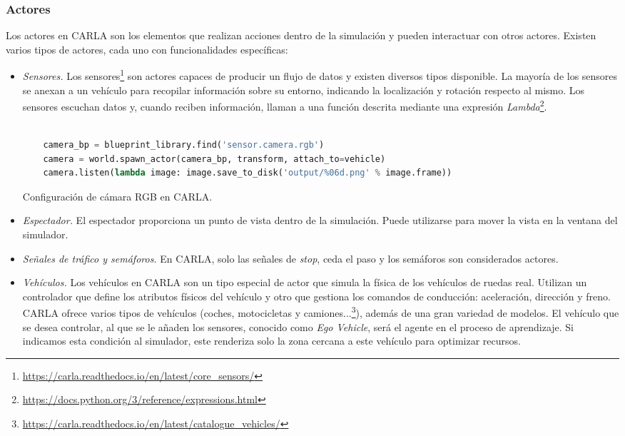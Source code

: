 \subsubsection{Actores}

Los actores en CARLA son los elementos que realizan acciones dentro de la simulación y pueden interactuar con otros actores. Existen varios tipos de actores, cada uno con funcionalidades específicas:

\begin{itemize}
\item \textit{Sensores.} Los sensores\footnote{\url{https://carla.readthedocs.io/en/latest/core_sensors/}} son actores capaces de producir un flujo de datos y existen diversos tipos disponible. La mayoría de los sensores se anexan a un vehículo para recopilar información sobre su entorno, indicando la localización y rotación respecto al mismo. Los sensores escuchan datos y, cuando reciben información, llaman a una función descrita mediante una expresión \textit{Lambda}\footnote{\url{https://docs.python.org/3/reference/expressions.html}}. 

	\begin{code}[h]
	\begin{lstlisting}[language=python]
	
	camera_bp = blueprint_library.find('sensor.camera.rgb')
	camera = world.spawn_actor(camera_bp, transform, attach_to=vehicle)
	camera.listen(lambda image: image.save_to_disk('output/%06d.png' % image.frame))

	\end{lstlisting}
	\caption[Configuración de cámara RGB en CARLA]{Configuración de cámara RGB en CARLA.}
	\label{cod:camara_carla}
	\end{code}


\item \textit{Espectador.} El espectador proporciona un punto de vista dentro de la simulación. Puede utilizarse para mover la vista en la ventana del simulador.
\item \textit{Señales de tráfico y semáforos.} En CARLA, solo las señales de \textit{stop}, ceda el paso y los semáforos son considerados actores.

\item \textit{Vehículos.} Los vehículos en CARLA son un tipo especial de actor que simula la física de los vehículos de ruedas real. Utilizan un controlador que define los atributos físicos del vehículo y otro que gestiona los comandos de conducción: aceleración, dirección y freno. CARLA ofrece varios tipos de vehículos (coches, motocicletas y camiones...\footnote{\url{https://carla.readthedocs.io/en/latest/catalogue_vehicles/}}), además de una gran variedad de modelos. El vehículo que se desea controlar, al que se le añaden los sensores, conocido como \textit{Ego Vehicle}, será el agente en el proceso de aprendizaje. Si indicamos esta condición al simulador, este renderiza solo la zona cercana a este vehículo para optimizar recursos.


\end{itemize}
